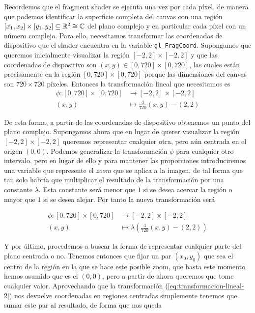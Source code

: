 Recordemos que el fragment shader se ejecuta una vez por cada píxel, de manera que podemos identificar la superficie completa del canvas con una región $[x_1,x_2]\times [y_1,y_2]\subseteq\mathbb{R}^2\cong\mathbb{C}$ del plano complejo y en particular cada píxel con un número complejo. Para ello, necesitamos transformar las coordenadas de dispositivo que el shader encuentra en la variable \verb|gl_FragCoord|. Supongamos que queremos inicialmente visualizar la región $[-2,2]\times[-2,2]$ y que las coordenadas de dispositivo son $(x,y)\in[0,720]\times[0,720]$, las cuales están precisamente en la región $[0,720]\times[0,720]$ porque las dimensiones del canvas son $720\times 720$ píxeles. Entonces la transformación lineal que necesitamos es 
\begin{equation}
\label{eq:transformacion-lineal-1}
\begin{split}
    \phi:[0,720]\times[0,720] & \longrightarrow [-2,2]\times[-2,2] \\
    (x,y) & \longmapsto \frac{4}{720}(x,y)-(2,2)
\end{split}
\end{equation}

De esta forma, a partir de las coordenadas de dispositivo obtenemos un punto del plano complejo. Supongamos ahora que en lugar de querer visualizar la región $[-2,2]\times[-2,2]$ queremos representar cualquier otra, pero aún centrada en el origen $(0,0)$. Podemos generalizar la transformación $\phi$ para cualquier otro intervalo, pero en lugar de ello y para mantener las proporciones introduciremos una variable que represente el \textit{zoom} que se aplica a la imagen, de tal forma que tan solo habría que multiplicar el resultado de la transformación por una constante $\lambda$. Esta constante será menor que $1$ si se desea acercar la región o mayor que $1$ si se desea alejar. Por tanto la nueva transformación será

\begin{equation}
    \label{eq:transformacion-lineal-2}
    \begin{split}
        \phi:[0,720]\times[0,720] & \longrightarrow [-2,2]\times[-2,2] \\
        (x,y) & \longmapsto \lambda\left(\frac{4}{720}(x,y)-(2,2)\right)
    \end{split}
\end{equation}

Y por último, procedemos a buscar la forma de representar cualquier parte del plano centrada o no. Tenemos entonces que fijar un par $(x_0,y_0)$ que sea el centro de la región en la que se hace este posible zoom, que hasta este momento hemos asumido que es el $(0,0)$, pero a partir de ahora queremos que tome cualquier valor. Aprovechando que la transformación (\ref{eq:transformacion-lineal-2}) nos devuelve coordenadas en regiones centradas simplemente tenemos que sumar este par al resultado, de forma que nos queda 

